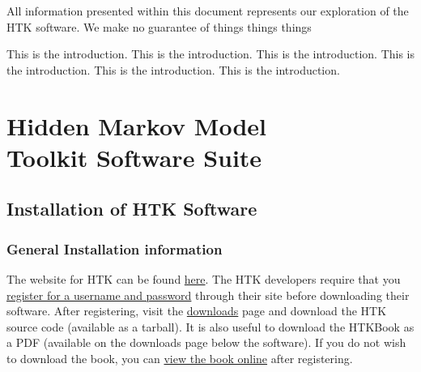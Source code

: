 \documentclass{wileySev}
\begin{document}

\subtitle{Probabilistic Accent Detection Using Hidden Markov Models}


\titlepage
\tableofcontents


\begin{preface}
All information presented within this document represents our exploration of the HTK software. We make no guarantee of things things things

\end{preface}

\begin{introduction}
This is the introduction.
This is the introduction.
This is the introduction.
This is the introduction.
This is the introduction.
This is the introduction.


\end{introduction}


\part[HTK Software Suite]
{Hidden Markov Model\\Toolkit Software Suite}

\chapter{Installation of HTK Software}
\section{General Installation information}
The website for HTK can be found \href{http://htk.eng.cam.ac.uk/}{here}. The HTK developers require that you \href{http://htk.eng.cam.ac.uk/register.shtml}{register for a username and password} through their site before downloading their software. After registering, visit the \href{http://htk.eng.cam.ac.uk/download.shtml}{downloads} page and download the HTK source code (available as a tarball). It is also useful to download the HTKBook as a PDF (available on the downloads page below the software). If you do not wish to download the book, you can \href{http://htk.eng.cam.ac.uk/docs/docs.shtml}{view the book online} after registering.
\end{document}
